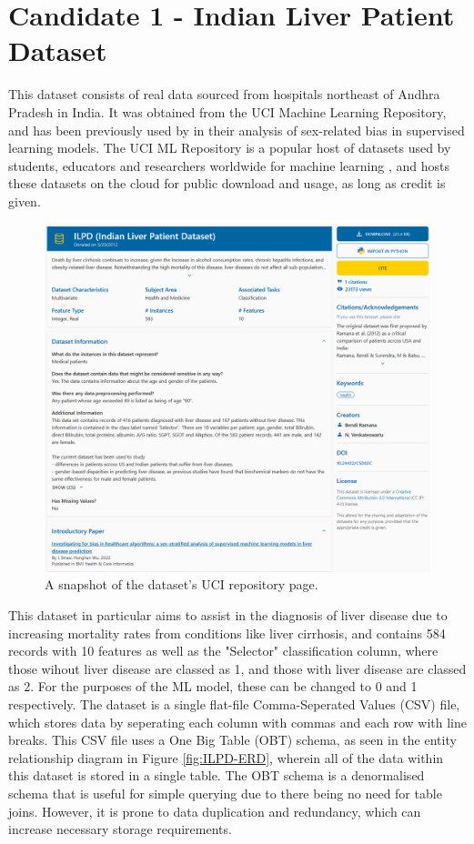 \documentclass[12pt]{report}
\begin{document}
\section{Candidate 1 - Indian Liver Patient Dataset}
This dataset \autocite{bendi_ramana_ilpd_2022} consists of real data sourced from hospitals northeast of Andhra Pradesh in India. It was obtained from the
UCI Machine Learning Repository, and has been previously used by \textcite{straw_investigating_2022} in their analysis of sex-related bias in supervised learning models. The UCI ML Repository is a popular host of datasets used by students, 
educators and researchers worldwide for machine learning \autocite{uci_machine_learning_repository_about_nodate}, and hosts these datasets 
on the cloud for public download and usage, as long as credit is given.

\begin{figure}[H]
    \centering
    \includegraphics[width=.75\linewidth]{ILPD-UCI.png}
    \caption{A snapshot of the dataset's UCI repository page.}
    \label{fig:ILPD-UCI}
\end{figure}

This dataset in particular aims to assist in the diagnosis of liver
disease due to increasing mortality rates from conditions like liver cirrhosis, and contains 584 records with 10 features
as well as the "Selector" classification column, where those wihout liver disease are classed as 1, and those with liver disease 
are classed as 2. For the purposes of the ML model, these can be changed to 0 and 1 respectively. 
The dataset is a single flat-file Comma-Seperated Values (CSV) file, which stores data by seperating each column with commas
and each row with line breaks. This CSV file uses a One Big Table (OBT) schema, as seen in the entity relationship diagram 
in Figure \ref{fig:ILPD-ERD}, wherein all of the data within this dataset is stored in a single table. 
The OBT schema is a denormalised schema that is useful for simple querying due to there being no need for table joins. 
However, it is prone to data duplication and redundancy, which can increase necessary storage requirements.
\end{document}
